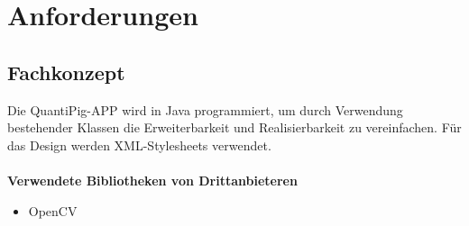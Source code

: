 \section{Anforderungen}

\subsection{\textbf{Fachkonzept}}
Die \acs{QuantiPig}-APP  wird in Java programmiert, um durch Verwendung bestehender Klassen die Erweiterbarkeit und Realisierbarkeit zu vereinfachen. Für das Design werden \acs{XML}-Stylesheets verwendet.
\\
\\
\textbf{Verwendete Bibliotheken von Drittanbieteren}
\begin{itemize}
	\item OpenCV 
\end{itemize}

